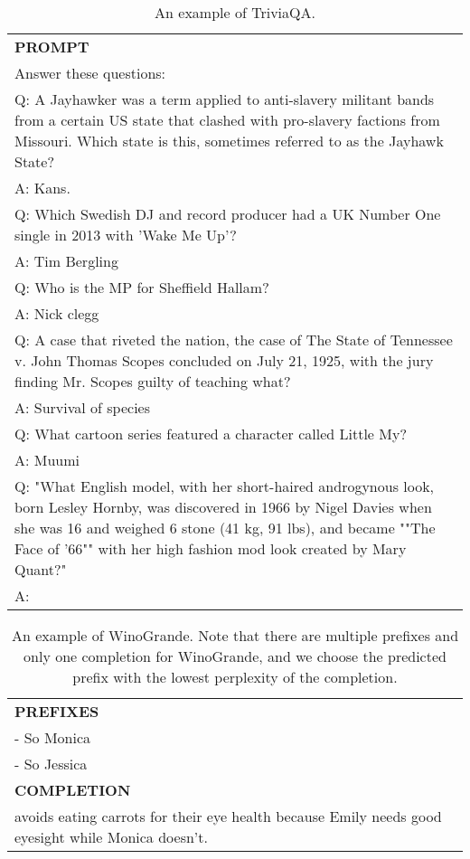 \begin{table}[ht]
    \centering \small
\begin{tabular}{p{12cm}}
\toprule
\textbf{PROMPT}\\
Answer these questions:\\
Q: A Jayhawker was a term applied to anti-slavery militant bands from a certain US state that clashed with pro-slavery factions from Missouri. Which state is this, sometimes referred to as the Jayhawk State?\\
A: Kans.\\
Q: Which Swedish DJ and record producer had a UK Number One single in 2013 with 'Wake Me Up'?\\
A: Tim Bergling\\
Q: Who is the MP for Sheffield Hallam?\\
A: Nick clegg\\
Q: A case that riveted the nation, the case of The State of Tennessee v. John Thomas Scopes concluded on July 21, 1925, with the jury finding Mr. Scopes guilty of teaching what?\\
A: Survival of species\\
Q: What cartoon series featured a character called Little My?\\
A: Muumi\\
Q: "What English model, with her short-haired androgynous look, born Lesley Hornby, was discovered in 1966 by Nigel Davies when she was 16 and weighed 6 stone (41 kg, 91 lbs), and became ""The Face of '66"" with her high fashion mod look created by Mary Quant?"\\
A:\\
\bottomrule
\end{tabular}
    \caption{\centering An example of TriviaQA.}
    \label{tab:triviaqa_eval_format_example}
\end{table}

\begin{table}[ht]
    \centering \small
\begin{tabular}{p{12cm}}
\toprule
\textbf{PREFIXES}\\
- So Monica\\
- So Jessica\\
\midrule
\textbf{COMPLETION}\\
avoids eating carrots for their eye health because Emily needs good eyesight while Monica doesn't.\\
\bottomrule
\end{tabular}
    \caption{An example of WinoGrande. Note that there are multiple prefixes and only one completion for WinoGrande, and we choose the predicted prefix with the lowest perplexity of the completion.}
    \label{tab:winogrande_eval_format_example}
\end{table}


